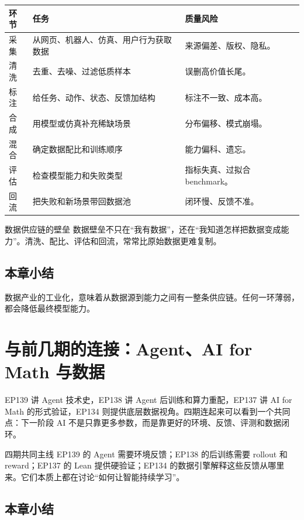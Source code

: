 \documentclass[a4paper]{article}
\begin{document}
\noindent\begin{longtable}{p{}p{}p{}}
\toprule
环节 & 任务 & 质量风险 \\
\midrule
采集 & 从网页、机器人、仿真、用户行为获取数据 & 来源偏差、版权、隐私。 \\
清洗 & 去重、去噪、过滤低质样本 & 误删高价值长尾。 \\
标注 & 给任务、动作、状态、反馈加结构 & 标注不一致、成本高。 \\
合成 & 用模型或仿真补充稀缺场景 & 分布偏移、模式崩塌。 \\
混合 & 确定数据配比和训练顺序 & 能力偏科、遗忘。 \\
评估 & 检查模型能力和失败类型 & 指标失真、过拟合 benchmark。 \\
回流 & 把失败和新场景带回数据池 & 闭环慢、反馈不准。 \\
\bottomrule
\end{longtable}

\begin{knowledgebox}{数据供应链的壁垒}
数据壁垒不只在“我有数据”，还在“我知道怎样把数据变成能力”。清洗、配比、评估和回流，常常比原始数据更难复制。
\end{knowledgebox}

\subsection{本章小结}

数据产业的工业化，意味着从数据源到能力之间有一整条供应链。任何一环薄弱，都会降低最终模型能力。

\section{与前几期的连接：Agent、AI for Math 与数据}

EP139 讲 Agent 技术史，EP138 讲 Agent 后训练和算力重配，EP137 讲 AI for Math 的形式验证，EP134 则提供底层数据视角。四期连起来可以看到一个共同点：下一阶段 AI 不是只靠更多参数，而是靠更好的环境、反馈、评测和数据闭环。

\begin{knowledgebox}{四期共同主线}
EP139 的 Agent 需要环境反馈；EP138 的后训练需要 rollout 和 reward；EP137 的 Lean 提供硬验证；EP134 的数据引擎解释这些反馈从哪里来。它们本质上都在讨论“如何让智能持续学习”。
\end{knowledgebox}

\subsection{本章小结}
\end{document}
